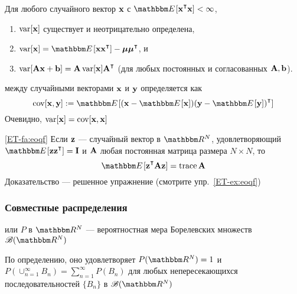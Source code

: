 \begin{frame}

    \vspace{2em}
    \Fact
    Для любого случайного вектор ${\mathbf x}$ с $\EE[ \boldx^\T\boldx ] < \infty$,
    \begin{enumerate}
        \item $\operatorname{var} [{\mathbf x}]$ существует и неотрицательно определена,
        \item $\var[\boldx] = \EE [\boldx \boldx^\T] - \boldmu \boldmu^\T$,
            и
        \item $\var[\boldA \boldx + \boldb] = \boldA \var[\boldx] \boldA^\T$
            \;\; (для любых постоянных и согласованных $\mathbf A, {\mathbf b}$).
    \end{enumerate}
    
\end{frame}


\begin{frame}

    \vspace{2em}
     между случайными векторами ${\mathbf x}$ и
    ${\mathbf y}$ определяется как 
    \begin{equation*}
        \cov [\boldx, \boldy]
        := \EE [ (\boldx - \EE [\boldx]) (\boldy - \EE [\boldy])^\T]
    \end{equation*}
    Очевидно, $\operatorname{var}[{\mathbf x}] = \operatorname{cov}[{\mathbf x}, {\mathbf x}]$
        
    \vspace{1em}
    \Fact\eqref{ET-fa:eoqf}
        Если ${\mathbf z}$ --- случайный вектор в $\RR^N$, удовлетворяющий $\EE[\boldz
        \boldz^\T] = \boldI$ и $\mathbf A$ любая постоянная матрица размера $N \times N$, то 
        \begin{equation*}
            \EE[\boldz^\T \boldA \boldz] = \trace \boldA
        \end{equation*}
    Доказательство --- решенное упражнение (смотрите упр.~\ref{ET-ex:eoqf})
    
\end{frame}

\begin{frame}\frametitle{Совместные распределения}

    \vspace{2em}
     или  $P$ в $\RR^N$ --- вероятностная мера
    Борелевских множеств $\bB(\RR^N)$
    
    \vspace{1em}    
    По определению, оно удовлетворяет
    $P(\RR^N) = 1$ и $P(\cup_{n=1}^{\infty} B_n) = \sum_{n=1}^\infty
    P(B_n)$ для любых непересекающихся последовательностей $\{B_n\}$ в $\bB(\RR^N)$
    
\end{frame}

